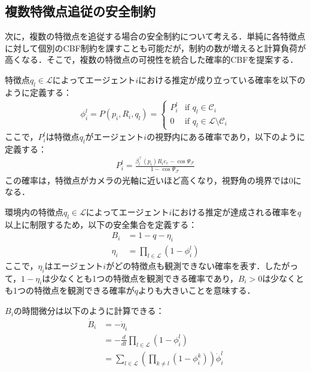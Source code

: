 \subsection{複数特徴点追従の安全制約}

次に，複数の特徴点を追従する場合の安全制約について考える．単純に各特徴点に対して個別のCBF制約を課すことも可能だが，制約の数が増えると計算負荷が高くなる．そこで，複数の特徴点の可視性を統合した確率的CBFを提案する．

特徴点$q_l \in \mathcal{L}$によってエージェント$i$における推定が成り立っている確率を以下のように定義する：
\begin{equation}
\begin{aligned}
\phi_i^l = P(p_i, R_i, q_l) = 
\begin{cases}
P_i^l & \text{if } q_l \in \mathcal{C}_i \\
0 & \text{if } q_l \in \mathcal{L} \setminus \mathcal{C}_i
\end{cases}
\label{eq:multi_probability}
\end{aligned}
\end{equation}
ここで，$P_i^l$は特徴点$q_l$がエージェント$i$の視野内にある確率であり，以下のように定義する：
\begin{equation}
\begin{aligned}
P_i^l = \frac{\beta_l^\top(p_i) R_i e_c - \cos\Psi_{\mathcal{F}}}{1 - \cos\Psi_{\mathcal{F}}}
\label{eq:visibility_probability}
\end{aligned}
\end{equation}
この確率は，特徴点がカメラの光軸に近いほど高くなり，視野角の境界では0になる．

環境内の特徴点$q_l \in \mathcal{L}$によってエージェント$i$における推定が達成される確率を$q$以上に制限するため，以下の安全集合を定義する：
\begin{equation}
\begin{aligned}
B_i &= 1 - q - \eta_i \\
\eta_i &= \prod_{l \in \mathcal{L}} (1 - \phi_i^l)
\label{eq:multi_safe_set}
\end{aligned}
\end{equation}
ここで，$\eta_i$はエージェント$i$がどの特徴点も観測できない確率を表す．したがって，$1 - \eta_i$は少なくとも1つの特徴点を観測できる確率であり，$B_i > 0$は少なくとも1つの特徴点を観測できる確率が$q$よりも大きいことを意味する．

$B_i$の時間微分は以下のように計算できる：
\begin{equation}
\begin{aligned}
\dot{B}_i &= -\dot{\eta}_i \\
&= -\frac{d}{dt}\prod_{l \in \mathcal{L}}(1 - \phi_i^l) \\
&= \sum_{l \in \mathcal{L}}\left(\prod_{k \neq l}(1 - \phi_i^k)\right)\dot{\phi}_i^l
\label{eq:multi_cbf_derivative}
\end{aligned}
\end{equation}

